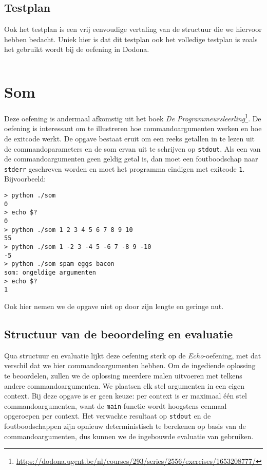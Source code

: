 \subsection{Testplan}\label{subsec:oefening-zero-testplan}

Ook het testplan is een vrij eenvoudige vertaling van de structuur die we hiervoor hebben bedacht.
Uniek hier is dat dit testplan ook het volledige testplan is zoals het gebruikt wordt bij de oefening in Dodona.

\inputminted{json}{sources/division-plan.tson}

\section{Som}\label{sec:oefeningen-som}

Deze oefening is andermaal afkomstig uit het boek \emph{De Programmeursleerling}\footnote{\url{https://dodona.ugent.be/nl/courses/293/series/2556/exercises/1653208777/}}.
De oefening is interessant om te illustreren hoe commandoargumenten werken en hoe de exitcode werkt.
De opgave bestaat eruit om een reeks getallen in te lezen uit de commandoparameters en de som ervan uit te schrijven op \texttt{stdout}.
Als een van de commandoargumenten geen geldig getal is, dan moet een foutboodschap naar \texttt{stderr} geschreven worden en moet het programma eindigen met exitcode \texttt{1}.
Bijvoorbeeld:

\begin{verbatim}
> python ./som
0
> echo $?
0
> python ./som 1 2 3 4 5 6 7 8 9 10
55
> python ./som 1 -2 3 -4 5 -6 7 -8 9 -10
-5
> python ./som spam eggs bacon
som: ongeldige argumenten
> echo $?
1
\end{verbatim}

Ook hier nemen we de opgave niet op door zijn lengte en geringe nut.

\subsection{Structuur van de beoordeling en evaluatie}\label{subsec:oefening-som-structuur}

Qua structuur en evaluatie lijkt deze oefening sterk op de \emph{Echo}-oefening, met dat verschil dat we hier commandoargumenten hebben.
Om de ingediende oplossing te beoordelen, zullen we de oplossing meerdere malen uitvoeren met telkens andere commandoargumenten.
We plaatsen elk stel argumenten in een eigen context.
Bij deze opgave is er geen keuze: per context is er maximaal één stel commandoargumenten, want de \texttt{main}-functie wordt hoogstens eenmaal opgeroepen per context.
Het verwachte resultaat op \texttt{stdout} en de foutboodschappen zijn opnieuw deterministisch te berekenen op basis van de commandoargumenten, dus kunnen we de ingebouwde evaluatie van \tested{} gebruiken.

